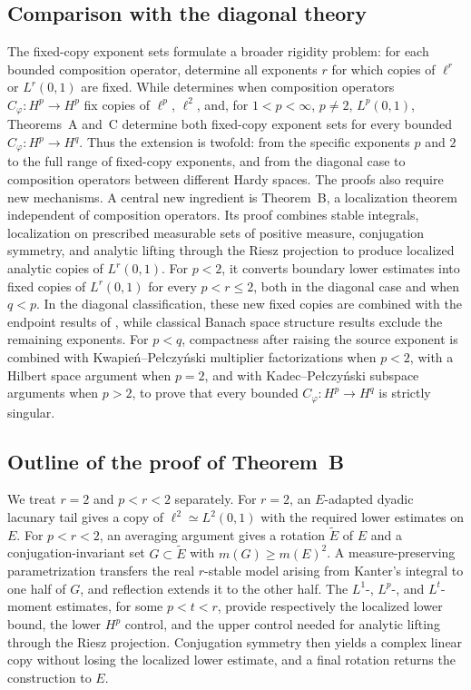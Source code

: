 \documentclass[10pt,a4paper]{amsart}
\begin{document}
\subsection*{Comparison with the diagonal theory}


The fixed-copy exponent sets formulate a broader rigidity problem:
for each bounded composition operator, determine all exponents
\(r\) for which copies of \(\ell^r\) or \(L^r(0,1)\) are fixed.
While \cite{LNST2017} determines when composition operators
\(C_\varphi:H^p\to H^p\) fix copies of \(\ell^p\), \(\ell^2\),
and, for \(1<p<\infty\), \(p\ne2\), \(L^p(0,1)\),
Theorems~A and~C determine both fixed-copy exponent sets for every
bounded \(C_\varphi:H^p\to H^q\). Thus the extension is twofold:
from the specific exponents \(p\) and \(2\) to the full range of
fixed-copy exponents, and from the diagonal case to composition
operators between different Hardy spaces. The proofs also require
new mechanisms. A central new ingredient is Theorem~B, a localization
theorem independent of composition operators. Its proof combines stable integrals, localization on
prescribed measurable sets of positive measure, conjugation symmetry,
and analytic lifting through the Riesz projection to produce
localized analytic copies of \(L^r(0,1)\). For \(p<2\), it converts boundary lower estimates into fixed copies
of \(L^r(0,1)\) for every \(p<r\le2\), both in the diagonal case
and when \(q<p\). In the diagonal classification, these new fixed
copies are combined with the endpoint results of \cite{LNST2017},
while classical Banach space structure results exclude the remaining
exponents. For \(p<q\),
compactness after raising the source exponent is combined with
Kwapie\'n--Pe{\l}czy\'nski multiplier factorizations when \(p<2\),
with a Hilbert space argument when \(p=2\), and with
Kadec--Pe{\l}czy\'nski subspace arguments when \(p>2\), to prove
that every bounded \(C_\varphi:H^p\to H^q\) is strictly singular.

\subsection*{Outline of the proof of Theorem~B}

We treat \(r=2\) and \(p<r<2\) separately. For \(r=2\), an
\(E\)-adapted dyadic lacunary tail gives a copy of
\(\ell^2\simeq L^2(0,1)\) with the required lower estimates on \(E\).
For \(p<r<2\), an averaging argument gives a rotation
\(\widetilde E\) of \(E\) and a conjugation-invariant set
\(G\subset\widetilde E\) with \(m(G)\ge m(E)^2\). A
measure-preserving parametrization transfers the real \(r\)-stable
model arising from Kanter's integral to one half of \(G\), and
reflection extends it to the other half. The \(L^1\)-, \(L^p\)-,
and \(L^t\)-moment estimates, for some \(p<t<r\), provide
respectively the localized lower bound, the lower \(H^p\) control,
and the upper control needed for analytic lifting through the Riesz
projection. Conjugation symmetry then yields a complex linear copy
without losing the localized lower estimate, and a final rotation
returns the construction to \(E\).
\end{document}
